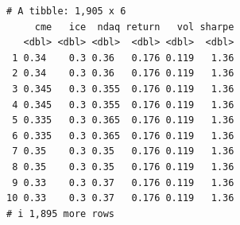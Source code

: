 \documentclass[
  a4paper,
  DIV=11,
  numbers=noendperiod]{scrreprt}
\newenvironment{Shaded}{\begin{snugshade}}{\end{snugshade}}
\newcommand{\AttributeTok}[1]{\textcolor[rgb]{0.40,0.45,0.13}{#1}}
\newcommand{\CommentTok}[1]{\textcolor[rgb]{0.37,0.37,0.37}{#1}}
\newcommand{\DecValTok}[1]{\textcolor[rgb]{0.68,0.00,0.00}{#1}}
\newcommand{\FloatTok}[1]{\textcolor[rgb]{0.68,0.00,0.00}{#1}}
\newcommand{\FunctionTok}[1]{\textcolor[rgb]{0.28,0.35,0.67}{#1}}
\newcommand{\NormalTok}[1]{\textcolor[rgb]{0.00,0.23,0.31}{#1}}
\newcommand{\OtherTok}[1]{\textcolor[rgb]{0.00,0.23,0.31}{#1}}
\newcommand{\SpecialCharTok}[1]{\textcolor[rgb]{0.37,0.37,0.37}{#1}}
\begin{document}
\begin{Shaded}
\end{Shaded}

\begin{verbatim}
# A tibble: 1,905 x 6
     cme   ice  ndaq return   vol sharpe
   <dbl> <dbl> <dbl>  <dbl> <dbl>  <dbl>
 1 0.34    0.3 0.36   0.176 0.119   1.36
 2 0.34    0.3 0.36   0.176 0.119   1.36
 3 0.345   0.3 0.355  0.176 0.119   1.36
 4 0.345   0.3 0.355  0.176 0.119   1.36
 5 0.335   0.3 0.365  0.176 0.119   1.36
 6 0.335   0.3 0.365  0.176 0.119   1.36
 7 0.35    0.3 0.35   0.176 0.119   1.36
 8 0.35    0.3 0.35   0.176 0.119   1.36
 9 0.33    0.3 0.37   0.176 0.119   1.36
10 0.33    0.3 0.37   0.176 0.119   1.36
# i 1,895 more rows
\end{verbatim}
\end{document}
